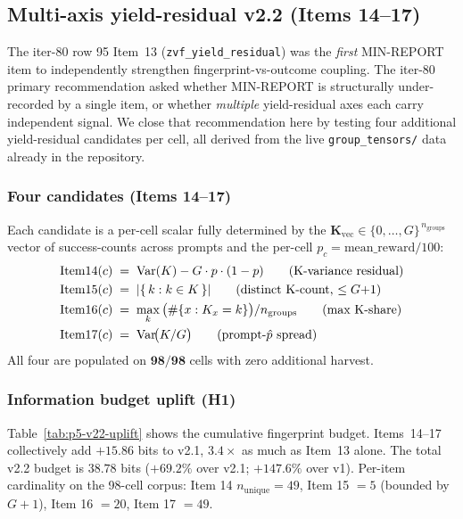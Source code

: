 \subsection{Multi-axis yield-residual v2.2 (Items 14--17)}
\label{sec:p5-iter81-yield-axes}

The iter-80 row 95 Item~13 (\texttt{zvf\_yield\_residual}) was the \emph{first}
MIN-REPORT item to independently strengthen fingerprint-vs-outcome coupling.
The iter-80 primary recommendation asked whether MIN-REPORT is structurally
under-recorded by a single item, or whether \emph{multiple} yield-residual
axes each carry independent signal. We close that recommendation here by
testing four additional yield-residual candidates per cell, all derived
from the live \texttt{group\_tensors/} data already in the repository.

\subsubsection{Four candidates (Items 14--17)}
Each candidate is a per-cell scalar fully determined by the
$\mathbf{K}_{\mathrm{vec}} \in \{0,\dots,G\}^{\,n_{\mathrm{groups}}}$ vector of
success-counts across prompts and the per-cell $p_c = \mathrm{mean\_reward}/100$:
\begin{align}
  \mathrm{Item14}(c) &\;=\; \mathrm{Var}(K) - G \cdot p \cdot (1-p) \tag{K-variance residual}\\
  \mathrm{Item15}(c) &\;=\; |\{\,k : k \in K\,\}| \tag{distinct K-count, $\le G{+}1$}\\
  \mathrm{Item16}(c) &\;=\; \max_k\,\bigl(\#\{x : K_x = k\}\bigr) / n_{\mathrm{groups}} \tag{max K-share}\\
  \mathrm{Item17}(c) &\;=\; \mathrm{Var}\!\bigl(K/G\bigr) \tag{prompt-$\hat p$ spread}\\
  \label{eq:items14-17}
\end{align}
All four are populated on $\mathbf{98/98}$ cells with zero additional harvest.

\subsubsection{Information budget uplift (H1)}
Table~\ref{tab:p5-v22-uplift} shows the cumulative fingerprint budget.
Items~14--17 collectively add $+15.86$ bits to v2.1, $\mathbf{3.4\times}$
as much as Item~13 alone. The total v2.2 budget is $38.78$ bits
($+69.2\%$ over v2.1; $+147.6\%$ over v1). Per-item cardinality on the
98-cell corpus: Item 14 $n_{\mathrm{unique}} = 49$, Item 15 $= 5$ (bounded
by $G+1$), Item 16 $= 20$, Item 17 $= 49$.


